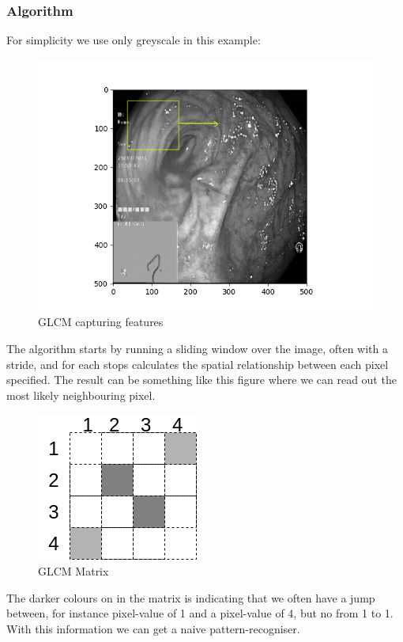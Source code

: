 \documentclass[a4paper,english]{ifimaster}
\begin{document}
	    \subsubsection{Algorithm}
	      For simplicity we use only greyscale in this example:
	      \begin{figure}[h]
		\centering
		\includegraphics[scale=0.5]{figures/sliding_window_box.png}
		\caption{GLCM capturing features}
	      \end{figure}
	      The algorithm starts by running a sliding window over the image, often with a stride, and for each stops calculates the spatial relationship between each pixel specified.
	      The result can be something like this figure %
	      where we can read out the most likely neighbouring pixel.
	       \begin{figure}[h]
		\centering
		\includegraphics[scale=0.5]{figures/Simple_GLCM.png}
		\caption{GLCM Matrix}
	      \end{figure}
	      The darker colours on in the matrix is indicating that we often have a jump between, for instance pixel-value of 1 and a pixel-value of 4, but no from 1 to 1.\\
	      With this information we can get a naive pattern-recogniser. 
\end{document}
